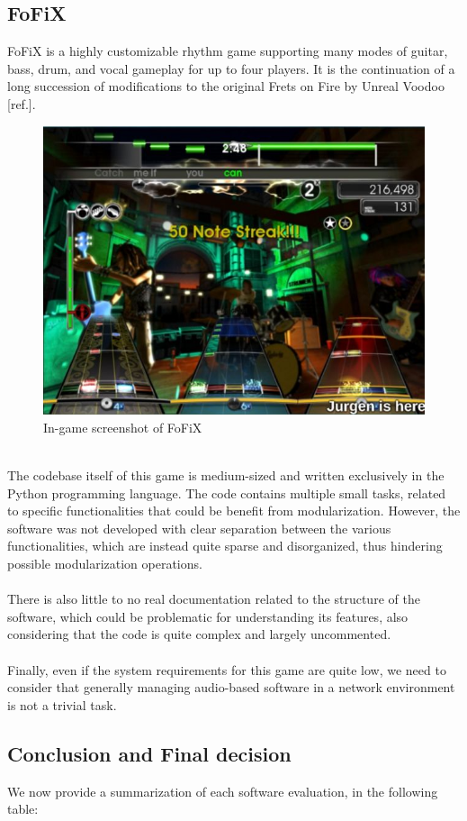 \subsection{FoFiX}
FoFiX is a highly customizable rhythm game supporting many modes of guitar, bass, drum, and vocal gameplay for up to four players. It is the continuation of a long succession of modifications to the original Frets on Fire by Unreal Voodoo [ref.]. 
\begin{figure}[h!]
	\centering
	\includegraphics[width=0.75\linewidth]{"immagini/Feasibility study/Fofix"}
	\caption[In-game screenshot of FoFiX]{In-game screenshot of FoFiX}
	\label{fig:fofix}
\end{figure}
\\ The codebase itself of this game is medium-sized and written exclusively in the Python programming language. The code contains multiple small tasks, related to specific functionalities that could be benefit from modularization. However, the software was not developed with clear separation between the various functionalities, which are instead quite sparse and disorganized, thus hindering possible modularization operations. \\ \\
There is also little to no real documentation related to the structure of the software, which could be problematic for understanding its features, also considering that the code is quite complex and largely uncommented. \\ \\
Finally, even if the system requirements for this game are quite low, we need to consider that generally managing audio-based software in a network environment is not a trivial task.

\subsection{Conclusion and Final decision}
We now provide a summarization of each software evaluation, in the following table:

